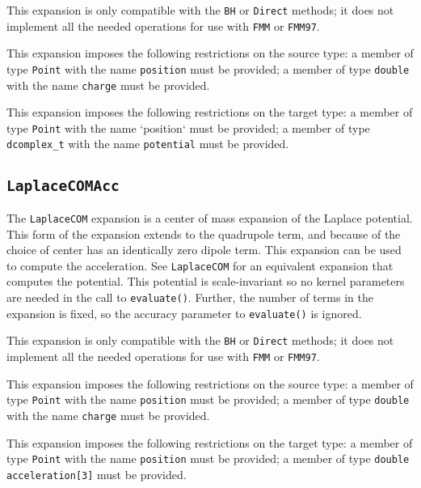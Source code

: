 This expansion is only compatible with the \texttt{BH} or \texttt{Direct}
methods; it does not implement all the needed operations for use with
\texttt{FMM} or \texttt{FMM97}.

This expansion imposes the following restrictions on the source type: a
member of type \texttt{Point} with the name \texttt{position} must be provided;
a member of type \texttt{double} with the name \texttt{charge} must be
provided.

This expansion imposes the following restrictions on the target type: a
member of type \texttt{Point} with the name `position` must be provided; a
member of type \texttt{dcomplex\_t} with the name \texttt{potential} must be
provided.

\subsection{\texttt{LaplaceCOMAcc}}

The \texttt{LaplaceCOM} expansion is a center of mass expansion of the Laplace
potential. This form of the expansion extends to the quadrupole term, and
because of the choice of center has an identically zero dipole term. This
expansion can be used to compute the acceleration. See \texttt{LaplaceCOM} for
an equivalent expansion that computes the potential. This potential is
scale-invariant so no kernel parameters are needed in the call to
\texttt{evaluate()}. Further, the number of terms in the expansion is fixed,
so the accuracy parameter to \texttt{evaluate()} is ignored.

This expansion is only compatible with the \texttt{BH} or \texttt{Direct}
methods; it does not implement all the needed operations for use with
\texttt{FMM} or \texttt{FMM97}.

This expansion imposes the following restrictions on the source type: a
member of type \texttt{Point} with the name \texttt{position} must be provided;
a member of  type \texttt{double} with the name \texttt{charge} must be
provided.

This expansion imposes the following restrictions on the target type: a
member of type \texttt{Point} with the name \texttt{position} must be provided;
a member of type \texttt{double acceleration[3]} must
be provided.
